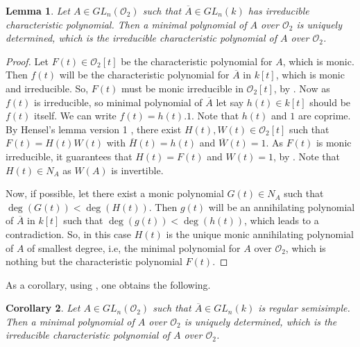 \documentclass[11pt,twoside]{amsart}
\newcommand{\R}{\mathscr{O}_2}
\newtheorem{lemma}{Lemma}[section]
\newtheorem{corollary}[lemma]{Corollary}
\theoremstyle{definition} %
\begin{document}
\begin{lemma}\label{lem:min=char-regsem}
Let $A\in GL_n(\R)$ such that $\overline{A} \in GL_n(k)$ has irreducible characteristic polynomial. Then a minimal polynomial of $A$ over $\R$ is uniquely determined, which is the irreducible characteristic polynomial of $A$ over $\R$.
\end{lemma}
\begin{proof}
Let $F(t)\in \R[t]$ be the characteristic polynomial for $A$, which is monic. Then ${f}(t)$ will be the characteristic polynomial for $\overline{A}$ in $k[t]$, which is monic and irreducible. So, $F(t)$ must be monic irreducible in $\R[t]$, by .
Now as ${f}(t)$ is irreducible, so minimal polynomial of $\overline{A}$ let say $h(t)\in k[t]$ should be ${f}(t)$ itself. We can write ${f}(t) = h(t).1$. Note that $h(t)$ and $1$ are coprime. By Hensel's lemma version 1 , there exist  $H(t), W(t)\in \R[t]$ such that $F(t) = H(t)W(t)$ with $\overline{H}(t)=h(t)$ and $\overline{W}(t)=1$. As $F(t)$ is monic irreducible, it guarantees that $H(t)=F(t)$ and $W(t)=1$, by . Note that $H(t)\in N_A$ as $W(A)$ is invertible.
    
Now, if possible, let there exist a monic polynomial $G(t)\in N_A$ such that $\deg(G(t))<\deg(H(t))$. Then ${g}(t)$ will be an annihilating polynomial of $\overline{A}$ in $k[t]$ such that $\deg({g}(t))< \deg(h(t))$, which leads to a contradiction. So, in this case $H(t)$ is the unique monic annihilating polynomial of $A$ of smallest degree, i.e, the minimal polynomial for $A$ over $\R$, which is nothing but the characteristic polynomial $F(t)$. 
\end{proof}
As a corollary, using , one obtains the following.
\begin{corollary}\label{cor:reg-sem-gen-null-ideal}
 Let $A\in GL_n(\R)$ such that $\overline{A} \in GL_n(k)$ is regular semisimple.
 Then a minimal polynomial of $A$ over $\R$ is uniquely determined, which is the irreducible characteristic polynomial of $A$ over $\R$.   
\end{corollary}
\end{document}
